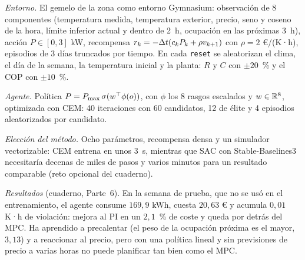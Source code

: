 \begin{ejemplo}\label{ej:caso-rl}
\emph{Entorno.} El gemelo de la zona como entorno Gymnasium: observación de 8 componentes (temperatura medida, temperatura exterior, precio, seno y coseno de la hora, límite inferior actual y dentro de 2~h, ocupación en las próximas 3~h), acción $P\in[0,3]$ kW, recompensa $r_k=-\Delta t(c_kP_k+\rho v_{k+1})$ con $\rho=2$ €/(K·h), episodios de 3 días truncados por tiempo. En cada \texttt{reset} se aleatorizan el clima, el día de la semana, la temperatura inicial y la planta: $R$ y $C$ con $\pm20$~\% y el COP con $\pm10$~\%.

\emph{Agente.} Política $P=P_{\max}\,\sigma(w^{\top}\phi(o))$, con $\phi$ los 8 rasgos escalados y $w\in\mathbb{R}^{8}$, optimizada con CEM: 40 iteraciones con 60 candidatos, 12 de élite y 4 episodios aleatorizados por candidato.

\emph{Elección del método.} Ocho parámetros, recompensa densa y un simulador vectorizable: CEM entrena en unos 3~s, mientras que SAC con Stable-Baselines3 necesitaría decenas de miles de pasos y varios minutos para un resultado comparable (reto opcional del cuaderno).

\emph{Resultados} (cuaderno, Parte~6). En la semana de prueba, que no se usó en el entrenamiento, el agente consume $169{,}9$ kWh, cuesta $20{,}63$ € y acumula $0{,}01$ K·h de violación: mejora al PI en un $2{,}1$~\% de coste y queda por detrás del MPC. Ha aprendido a precalentar (el peso de la ocupación próxima es el mayor, $3{,}13$) y a reaccionar al precio, pero con una política lineal y sin previsiones de precio a varias horas no puede planificar tan bien como el MPC.
\end{ejemplo}

